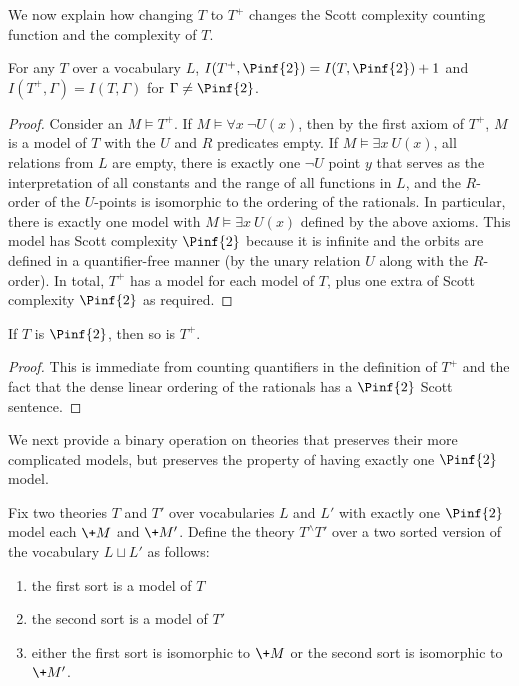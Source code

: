 \documentclass{amsart}
\renewcommand{\-}{\text{-}}
\begin{document}
We now explain how changing $T$ to $T^+$ changes the Scott complexity counting function and the complexity of $T$.

\begin{lemma}
For any $T$ over a vocabulary $L$, $I(T^+,\Pinf{2})=I(T,\Pinf{2})+1$ and $I(T^+,\Gamma)=I(T,\Gamma)$ for $\Gamma\neq \Pinf{2}$.
\end{lemma}

\begin{proof}
Consider an $M\models T^+$. 
If $M\models \forall x\ \lnot U(x)$, then by the first axiom of $T^+$, $M$ is a model of $T$ with the $U$ and $R$ predicates empty.
If $M\models \exists x\ U(x)$, all relations from $L$ are empty, there is exactly one $\lnot U$ point $y$ that serves as the interpretation of all constants and the range of all functions in $L$, and the $R$-order of the $U$-points is isomorphic to the ordering of the rationals.
In particular, there is exactly one model with $M\models \exists x\ U(x)$ defined by the above axioms.
This model has Scott complexity $\Pinf{2}$ because it is infinite and the orbits are defined in a quantifier-free manner (by the unary relation $U$ along with the $R$-order).
In total, $T^+$ has a model for each model of $T$, plus one extra of Scott complexity $\Pinf{2}$ as required.
\end{proof}

\begin{lemma}
If $T$ is $\Pinf{2}$, then so is $T^+$.
\end{lemma}

\begin{proof}
This is immediate from counting quantifiers in the definition of $T^+$ and the fact that the dense linear ordering of the rationals has a $\Pinf{2}$ Scott sentence.
\end{proof}

We next provide a binary operation on theories that preserves their more complicated models, but preserves the property of having exactly one $\Pinf{2}$ model.

\begin{definition}
Fix two theories $T$ and $T'$ over vocabularies $L$ and $L'$ with exactly one $\Pinf{2}$ model each $\+M$ and $\+M'$.
Define the theory $T^\wedge T'$ over a two sorted version of the vocabulary $L\sqcup L'$ as follows:
\begin{enumerate}
	\item the first sort is a model of $T$
	\item the second sort is a model of $T'$
	\item either the first sort is isomorphic to $\+M$ or the second sort is isomorphic to $\+M'$.
\end{enumerate}
\end{definition}
\end{document}
